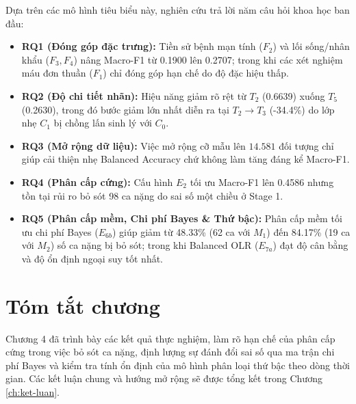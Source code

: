 Dựa trên các mô hình tiêu biểu này, nghiên cứu trả lời năm câu hỏi khoa học ban đầu:
\begin{itemize}
    \item \textbf{RQ1 (Đóng góp đặc trưng):} Tiền sử bệnh mạn tính ($F_2$) và lối sống/nhân khẩu ($F_3, F_4$) nâng Macro-F1 từ 0.1900 lên 0.2707; trong khi các xét nghiệm máu đơn thuần ($F_1$) chỉ đóng góp hạn chế do độ đặc hiệu thấp.
    \item \textbf{RQ2 (Độ chi tiết nhãn):} Hiệu năng giảm rõ rệt từ $T_2$ (0.6639) xuống $T_5$ (0.2630), trong đó bước giảm lớn nhất diễn ra tại $T_2 \to T_3$ (-34.4\%) do lớp nhẹ $C_1$ bị chồng lấn sinh lý với $C_0$.
    \item \textbf{RQ3 (Mở rộng dữ liệu):} Việc mở rộng cỡ mẫu lên $14.581$ đối tượng chỉ giúp cải thiện nhẹ Balanced Accuracy chứ không làm tăng đáng kể Macro-F1.
    \item \textbf{RQ4 (Phân cấp cứng):} Cấu hình $E_2$ tối ưu Macro-F1 lên 0.4586 nhưng tồn tại rủi ro bỏ sót 98 ca nặng do sai số một chiều ở Stage 1.
    \item \textbf{RQ5 (Phân cấp mềm, Chi phí Bayes \& Thứ bậc):} Phân cấp mềm tối ưu chi phí Bayes ($E_{6b}$) giúp giảm từ 48.33\% (62 ca với $M_1$) đến 84.17\% (19 ca với $M_2$) số ca nặng bị bỏ sót; trong khi Balanced OLR ($E_{7a}$) đạt độ cân bằng và độ ổn định ngoại suy tốt nhất.
\end{itemize}

\section{Tóm tắt chương}
\label{sec:tom-tat-chuong-4}

Chương 4 đã trình bày các kết quả thực nghiệm, làm rõ hạn chế của phân cấp cứng trong việc bỏ sót ca nặng, định lượng sự đánh đổi sai số qua ma trận chi phí Bayes và kiểm tra tính ổn định của mô hình phân loại thứ bậc theo dòng thời gian. Các kết luận chung và hướng mở rộng sẽ được tổng kết trong Chương \ref{ch:ket-luan}.
